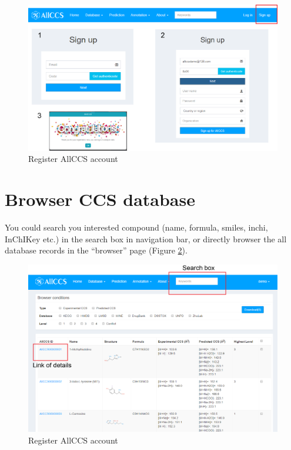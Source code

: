 \documentclass[12pt,]{book}
\theoremstyle{definition}
\theoremstyle{definition}
\theoremstyle{definition}
\theoremstyle{remark}
\begin{document}
\begin{figure}

{\centering \includegraphics{images/chapter1/register_1} 

}

\caption{Register AllCCS account}\label{fig:FigRegister}
\end{figure}

\section{Browser CCS database}\label{browser-ccs-database}

You could search you interested compound (name, formula, smiles, inchi,
InChIKey etc.) in the search box in navigation bar, or directly browser
the all database records in the ``browser'' page (Figure
\ref{fig:FigBrowser1}).

\begin{figure}

{\centering \includegraphics{images/chapter1/browser_1} 

}

\caption{Register AllCCS account}\label{fig:FigBrowser1}
\end{figure}
\end{document}
